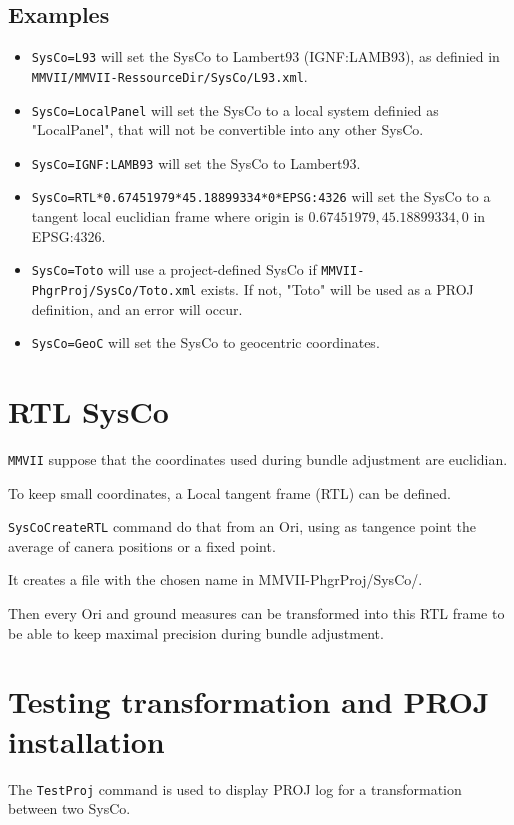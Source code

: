 \subsection{Examples}
\begin{itemize}
\item {\tt SysCo=L93} will set the SysCo to Lambert93 (IGNF:LAMB93), as definied in \\
{\tt MMVII/MMVII-RessourceDir/SysCo/L93.xml}.
\item {\tt SysCo=LocalPanel} will set the SysCo to a local system definied as "LocalPanel", that will not be convertible into any other SysCo.
\item {\tt SysCo=IGNF:LAMB93} will set the SysCo to Lambert93.
\item {\tt SysCo=RTL*0.67451979*45.18899334*0*EPSG:4326} will set the SysCo to a tangent local euclidian frame where origin is $0.67451979, 45.18899334, 0$ in EPSG:4326.
\item {\tt SysCo=Toto} will use a project-defined SysCo if {\tt MMVII-PhgrProj/SysCo/Toto.xml} exists. If not, "Toto" will be used as a PROJ definition, and an error will occur.
\item {\tt SysCo=GeoC} will set the SysCo to geocentric coordinates.

\end{itemize}


\section{RTL SysCo}
\label{SysCoRTL}
{\tt MMVII} suppose that the coordinates used during bundle adjustment are euclidian.

To keep small coordinates, a Local tangent frame (RTL) can be defined.

{\tt SysCoCreateRTL} command do that from an Ori, using as tangence point the average of canera positions or a fixed point.

It creates a file with the chosen name in {MMVII-PhgrProj/SysCo/}.

Then every Ori and ground measures can be transformed into this RTL frame to be able to keep maximal precision during bundle adjustment.


\section{Testing transformation and PROJ installation}
The {\tt TestProj} command is used to display PROJ log for a transformation between two SysCo.

